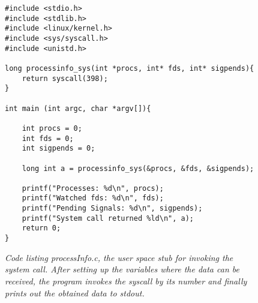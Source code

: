 \documentclass[a4paper,11pt,twoside]{article}
\begin{document}
\begin{figure}
  \label{fig:sigpending}
  \centering
  \begin{verbatim}
#include <stdio.h>
#include <stdlib.h>
#include <linux/kernel.h>
#include <sys/syscall.h>
#include <unistd.h>

long processinfo_sys(int *procs, int* fds, int* sigpends){
	return syscall(398);
}

int main (int argc, char *argv[]){

	int procs = 0;
	int fds = 0;
	int sigpends = 0;

	long int a = processinfo_sys(&procs, &fds, &sigpends);

	printf("Processes: %d\n", procs);
	printf("Watched fds: %d\n", fds);
	printf("Pending Signals: %d\n", sigpends);
	printf("System call returned %ld\n", a);
	return 0;
}

  \end{verbatim}
  \caption{\textit{Code listing processInfo.c, the user space stub for
  invoking the system call. After setting up the variables where the data
  can be received, the program invokes the syscall by its number and finally
  prints out the obtained data to stdout.}}

\end{figure}


\end{document}
